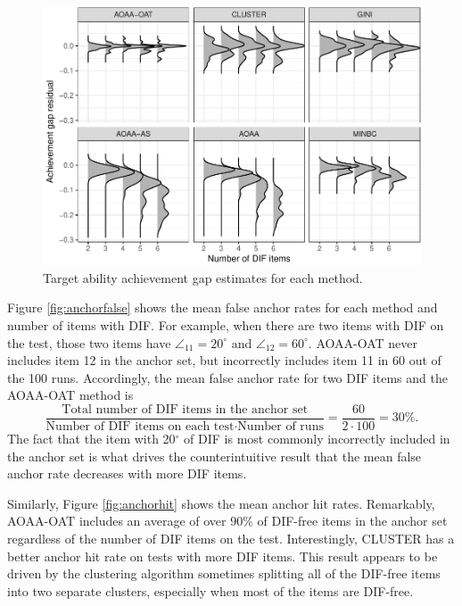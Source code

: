 \documentclass[
  11pt,
]{article}
\begin{document}
\begin{figure}[H]

{\centering \includegraphics[width=0.7\linewidth]{paper_files/figure-latex/achievegap-1} 

}

\caption{Target ability achievement gap estimates for each method.}\label{fig:achievegap}
\end{figure}

Figure \ref{fig:anchorfalse} shows the mean false anchor rates for each method and number of items with DIF. For example, when there are two items with DIF on the test, those two items have \(\angle_{11} = 20^\circ\) and \(\angle_{12} = 60^\circ\). AOAA-OAT never includes item 12 in the anchor set, but incorrectly includes item 11 in 60 out of the 100 runs. Accordingly, the mean false anchor rate for two DIF items and the AOAA-OAT method is
\[
\dfrac{\text{Total number of DIF items in the anchor set}}{\text{Number of DIF items on each test} \cdot \text{Number of runs}} = \dfrac{60}{2 \cdot 100} = 30\%.
\]
The fact that the item with 20\(^\circ\) of DIF is most commonly incorrectly included in the anchor set is what drives the counterintuitive result that the mean false anchor rate decreases with more DIF items.

Similarly, Figure \ref{fig:anchorhit} shows the mean anchor hit rates. Remarkably, AOAA-OAT includes an average of over \(90\%\) of DIF-free items in the anchor set regardless of the number of DIF items on the test. Interestingly, CLUSTER has a better anchor hit rate on tests with more DIF items. This result appears to be driven by the clustering algorithm sometimes splitting all of the DIF-free items into two separate clusters, especially when most of the items are DIF-free.
\end{document}
